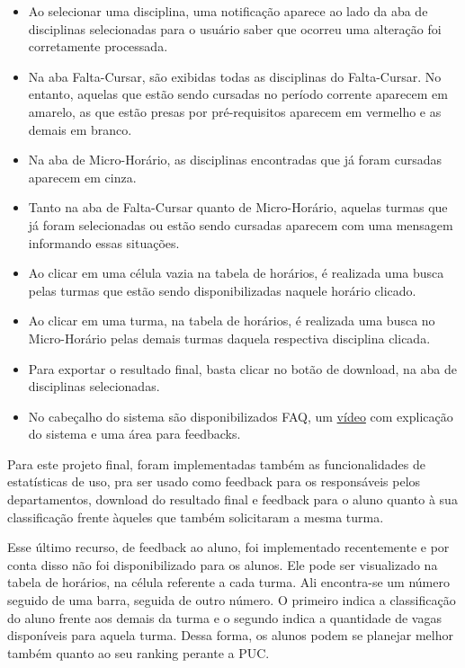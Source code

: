 \documentclass[graduacao,brazil]{ThesisPUC}
\begin{document}
\begin{itemize}

	\item Ao selecionar uma disciplina, uma notificação aparece ao lado da aba de disciplinas selecionadas para o usuário saber que ocorreu uma alteração foi corretamente processada.
	\item Na aba Falta-Cursar, são exibidas todas as disciplinas do Falta-Cursar. No entanto, aquelas que estão sendo cursadas no período corrente aparecem em amarelo, as que estão presas por pré-requisitos aparecem em vermelho e as demais em branco.
	\item Na aba de Micro-Horário, as disciplinas encontradas que já foram cursadas aparecem em cinza.
	\item Tanto na aba de Falta-Cursar quanto de Micro-Horário, aquelas turmas que já foram selecionadas ou estão sendo cursadas aparecem com uma mensagem informando essas situações.
	\item Ao clicar em uma célula vazia na tabela de horários, é realizada uma busca pelas turmas que estão sendo disponibilizadas naquele horário clicado.
	\item Ao clicar em uma turma, na tabela de horários, é realizada uma busca no Micro-Horário pelas demais turmas daquela respectiva disciplina clicada.
	\item Para exportar o resultado final, basta clicar no botão de download, na aba de disciplinas selecionadas.
	\item No cabeçalho do sistema são disponibilizados FAQ, um \href{https://www.youtube.com/watch?v=XHF8WOJ6xI0}{vídeo} com explicação do sistema e uma área para feedbacks.

\end{itemize}

Para este projeto final, foram implementadas também as funcionalidades de estatísticas de uso, pra ser usado como feedback para os responsáveis pelos departamentos, download do resultado final e feedback para o aluno quanto à sua classificação frente àqueles que também solicitaram a mesma turma.

Esse último recurso, de feedback ao aluno, foi implementado recentemente e por conta disso não foi disponibilizado para os alunos. Ele pode ser visualizado na tabela de horários, na célula referente a cada turma. Ali encontra-se um número seguido de uma barra, seguida de outro número. O primeiro indica a classificação do aluno frente aos demais da turma e o segundo indica a quantidade de vagas disponíveis para aquela turma. Dessa forma, os alunos podem se planejar melhor também quanto ao seu ranking perante a PUC.
\end{document}
